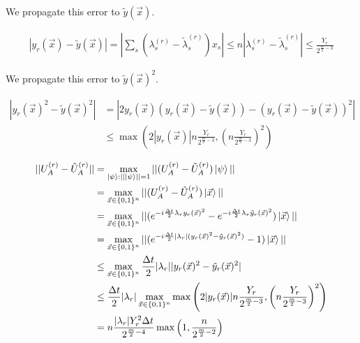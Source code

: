 We propagate this error to $\tilde{y}(\vec{x})$.

\begin{equation}
    \begin{split}
        |y_r(\vec{x}) - \tilde{y}(\vec{x})| = |\sum_s (\lambda^{(r)}_s - \tilde{\lambda}^{(r)}_s)x_s| \leq n|\lambda^{(r)}_s - \tilde{\lambda}^{(r)}_s| \leq \frac{Y_r}{2^{\frac{m}{2} - 3}}
    \end{split}
\end{equation}

We propagate this error to $\tilde{y}(\vec{x})^2$.

\begin{equation}
    \begin{split}
        |y_r(\vec{x})^2 - \tilde{y}(\vec{x})^2| &= |2y_r(\vec{x})(y_r(\vec{x}) - \tilde{y}(\vec{x})) - (y_r(\vec{x}) - \tilde{y}(\vec{x}))^2| \\
        &\leq \max\left(2|y_r(\vec{x})|n\frac{Y_r}{2^{\frac{m}{2} - 3}}, \left(n\frac{Y_r}{2^{\frac{m}{2} - 3}}\right)^2\right)
    \end{split}
\end{equation}

\begin{equation}
    \begin{split}
        ||U_A^{(r)} - \tilde{U}_A^{(r)}|| &= \max_{\ket{\psi} : ||\ket{\psi}|| = 1} ||(U_A^{(r)} - \tilde{U}_A^{(r)})\ket{\psi}|| \\
        &= \max_{\vec{x} \in \{0, 1\}^n} ||(U_A^{(r)} - \tilde{U}_A^{(r)})\ket{\vec{x}}|| \\
        &= \max_{\vec{x} \in \{0, 1\}^n} ||(e^{-i\frac{\Delta t}{2}\lambda_ry_r(\vec{x})^2} - e^{-i\frac{\Delta t}{2}\lambda_r\tilde{y}_r(\vec{x})^2})\ket{\vec{x}}|| \\
        &= \max_{\vec{x} \in \{0, 1\}^n} ||(e^{-i\frac{\Delta t}{2}|\lambda_r|(y_r(\vec{x})^2 - \tilde{y}_r(\vec{x})^2)} - 1)\ket{\vec{x}}|| \\
        &\leq \max_{\vec{x} \in \{0, 1\}^n} \frac{\Delta t}{2}|\lambda_r||y_r(\vec{x})^2 - \tilde{y}_r(\vec{x})^2| \\
        &\leq \frac{\Delta t}{2}|\lambda_r|\max_{\vec{x} \in \{0, 1\}^n} \max\left(2|y_r(\vec{x})|n\frac{Y_r}{2^{\frac{m}{2} - 3}}, \left(n\frac{Y_r}{2^{\frac{m}{2} - 3}}\right)^2\right) \\
        &= n\frac{|\lambda_r| Y_r^2\Delta t}{2^{\frac{m}{2} - 4}}\max\left(1, \frac{n}{2^{\frac{m}{2} - 2}}\right)
    \end{split}
\end{equation}

